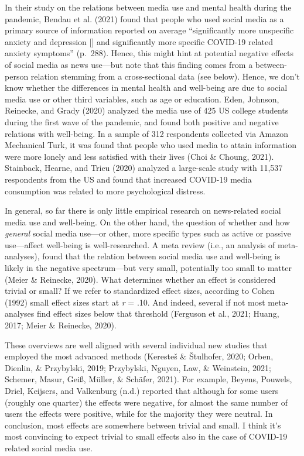 \documentclass[
  english,
  man,mask,floatsintext]{apa6}
\begin{document}
In their study on the relations between media use and mental health during the pandemic, Bendau et al. (2021) found that people who used social media as a primary source of information reported on average ``significantly more unspecific anxiety and depression {[}{]} and significantly more specific COVID-19 related anxiety symptoms'' (p.~288).
Hence, this might hint at potential negative effects of social media as news use---but note that this finding comes from a between-person relation stemming from a cross-sectional data (see below).
Hence, we don't know whether the differences in mental health and well-being are due to social media use or other third variables, such as age or education.
Eden, Johnson, Reinecke, and Grady (2020) analyzed the media use of 425 US college students during the first wave of the pandemic, and found both positive and negative relations with well-being.
In a sample of 312 respondents collected via Amazon Mechanical Turk, it was found that people who used media to attain information were more lonely and less satisfied with their lives (Choi \& Choung, 2021).
Stainback, Hearne, and Trieu (2020) analyzed a large-scale study with 11,537 respondents from the US and found that increased COVID-19 media consumption was related to more psychological distress.

In general, so far there is only little empirical research on news-related social media use and well-being.
On the other hand, the question of whether and how \emph{general} social media use---or other, more specific types such as active or passive use---affect well-being is well-researched.
A meta review (i.e., an analysis of meta-analyses), found that the relation between social media use and well-being is likely in the negative spectrum---but very small, potentially too small to matter (Meier \& Reinecke, 2020).
What determines whether an effect is considered trivial or small?
If we refer to standardized effect sizes, according to Cohen (1992) small effect sizes start at \emph{r} = .10.
And indeed, several if not most meta-analyses find effect sizes below that threshold (Ferguson et al., 2021; Huang, 2017; Meier \& Reinecke, 2020).

These overviews are well aligned with several individual new studies that employed the most advanced methods (Keresteš \& Štulhofer, 2020; Orben, Dienlin, \& Przybylski, 2019; Przybylski, Nguyen, Law, \& Weinstein, 2021; Schemer, Masur, Geiß, Müller, \& Schäfer, 2021).
For example, Beyens, Pouwels, Driel, Keijsers, and Valkenburg (n.d.) reported that although for some users (roughly one quarter) the effects were negative, for almost the same number of users the effects were positive, while for the majority they were neutral.
In conclusion, most effects are somewhere between trivial and small.
I think it's most convincing to expect trivial to small effects also in the case of COVID-19 related social media use.
\end{document}
